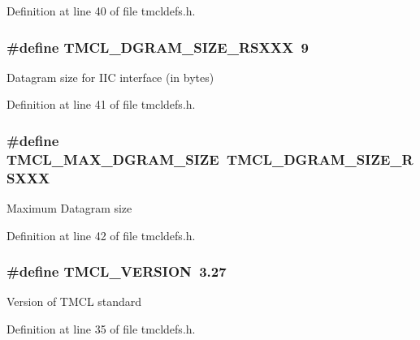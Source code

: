 Definition at line 40 of file tmcldefs.h.\hypertarget{group__TMCLMisc_ga893fbfdcd1c9af739173be6476ad1696}{
\subsubsection[{TMCL\_\-DGRAM\_\-SIZE\_\-RSXXX}]{\setlength{\rightskip}{0pt plus 5cm}\#define TMCL\_\-DGRAM\_\-SIZE\_\-RSXXX~9}}
\label{group__TMCLMisc_ga893fbfdcd1c9af739173be6476ad1696}
Datagram size for IIC interface (in bytes) 

Definition at line 41 of file tmcldefs.h.\hypertarget{group__TMCLMisc_gad1cf3cae816b86b67bb50098b690a010}{
\subsubsection[{TMCL\_\-MAX\_\-DGRAM\_\-SIZE}]{\setlength{\rightskip}{0pt plus 5cm}\#define TMCL\_\-MAX\_\-DGRAM\_\-SIZE~TMCL\_\-DGRAM\_\-SIZE\_\-RSXXX}}
\label{group__TMCLMisc_gad1cf3cae816b86b67bb50098b690a010}
Maximum Datagram size 

Definition at line 42 of file tmcldefs.h.\hypertarget{group__TMCLMisc_ga420f7d4b6299372763e4ac6ca6d4919a}{
\subsubsection[{TMCL\_\-VERSION}]{\setlength{\rightskip}{0pt plus 5cm}\#define TMCL\_\-VERSION~3.27}}
\label{group__TMCLMisc_ga420f7d4b6299372763e4ac6ca6d4919a}
Version of TMCL standard 

Definition at line 35 of file tmcldefs.h.